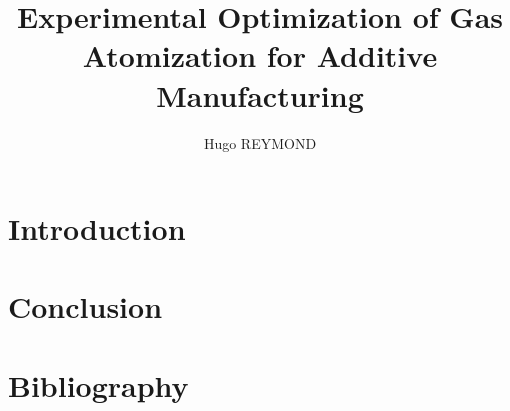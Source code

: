 \documentclass[12pt,twoside,openright]{book}
\begin{document}
\frontmatter
\title{Experimental Optimization of Gas Atomization for Additive Manufacturing}
\author{Hugo REYMOND}
\date{}
\maketitle

\tableofcontents
\listoffigures
\listoftables

\mainmatter

\chapter*{Introduction}
\markboth{}{ }




\chapter*{Conclusion}
\markboth{}{ }

\backmatter
\appendix



\chapter*{Bibliography}
\markboth{}{ }



\end{document}
